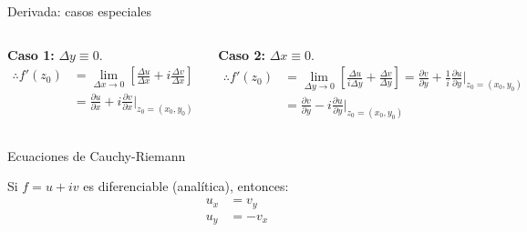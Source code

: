 \documentclass[9pt, aspectratio=169]{beamer}
\begin{document}
\begin{frame}{Derivada: casos especiales}
	\begin{columns}[t]
		\textbf{Caso 1:} $\Delta y \equiv 0$.
		\begin{align*}
			\therefore f'(z_0) & = \lim_{\Delta x \rightarrow 0} \left[ \frac{\Delta u}{\Delta x} + i \frac{\Delta v}{\Delta x} \right] \\
			                   & = \frac{\partial u}{\partial x} + i \frac{\partial v}{\partial x} \biggr\rvert_{z_0 = (x_0, y_0)}
		\end{align*} \pause

		\textbf{Caso 2:} $\Delta x \equiv 0$.
		\begin{align*}
			\therefore f'(z_0) & = \lim_{\Delta y \rightarrow 0} \left[ \frac{\Delta u}{i \Delta y} +  \frac{\Delta v}{\Delta y} \right] = \frac{\partial v}{\partial y} + \frac{1}{i} \frac{\partial u}{\partial y} \biggr\rvert_{z_0 = (x_0, y_0)} \\
			                   & = \frac{\partial v}{\partial y} - i \frac{\partial u}{\partial y} \biggr\rvert_{z_0 = (x_0, y_0)}
		\end{align*} \pause
	\end{columns}
	\vspace{2em}

	\begin{block}{Ecuaciones de Cauchy-Riemann}
		\begin{center}
			Si $f = u + i v$ es diferenciable (\alert{analítica}), entonces:
			\begin{align*}
				u_x & = v_y  \\
				u_y & = -v_x
			\end{align*}
		\end{center}
	\end{block}
\end{frame}
\end{document}
